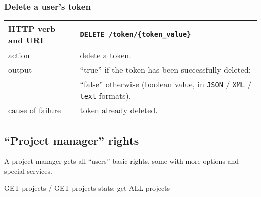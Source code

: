 \subsubsection{Delete a user's token}
\begin{tabular}{ | l | l | }
	\hline
	HTTP verb and URI & \texttt{DELETE /token/\{token\_value\}} \\
	\hline
	action & delete a token. \\
	\hline
	output & ``true'' if the token has been successfully deleted; \\
	\space & ``false'' otherwise (boolean value, in \texttt{JSON} / \texttt{XML} / \texttt{text} formats). \\
	\hline
	cause of failure & token already deleted. \\
	\hline
\end{tabular}
\newline

\subsection{``Project manager'' rights}
\hspace*{\parindent}
A project manager gets all ``users'' basic rights, some with more options and special services.
\newline

\hspace*{\parindent}
GET projects / GET projects-stats: get ALL projects
\newline

